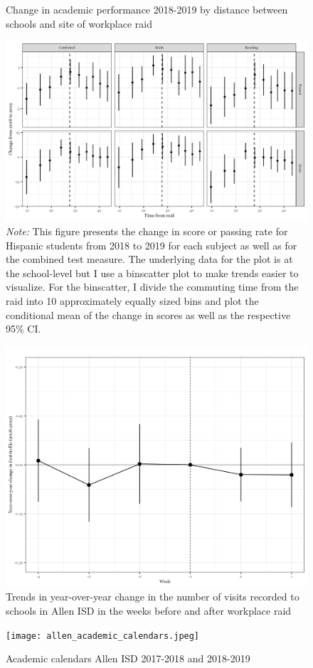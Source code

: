 \documentclass[hidelinks,twoside]{article}
\begin{document}
\begin{figure}[H]
\caption{Change in academic performance 2018-2019 by distance between schools and site of workplace raid}
\centering
\includegraphics[scale=0.8]{distance_performance.png}
\caption*{\footnotesize \emph{Note:} This figure presents the change in score or passing rate for Hispanic students from 2018 to 2019 for each subject as well as for the combined test measure. The underlying data for the plot is at the school-level but I use a binscatter plot to make trends easier to visualize. For the binscatter, I divide the commuting time from the raid into 10 approximately equally sized bins and plot the conditional mean of the change in scores as well as the respective 95\% CI.} 
\label{fig:distanceperformance}
\end{figure}


\vspace{1ex}
\begin{figure}[H]
\caption{{Trends in year-over-year change in the number of visits recorded to schools in Allen ISD in the weeks before and after workplace raid}}
\centerline{\includegraphics[scale=0.8]{safegraph_event_study.png}}
\end{figure}

\vspace{1ex}
\begin{figure}[H]
\caption{{Academic calendars Allen ISD 2017-2018 and 2018-2019}}
\centerline{\texttt{[image: allen\_academic\_calendars.jpeg]}}
\label{fig:allencal}
\end{figure}


\clearpage
\end{document}
